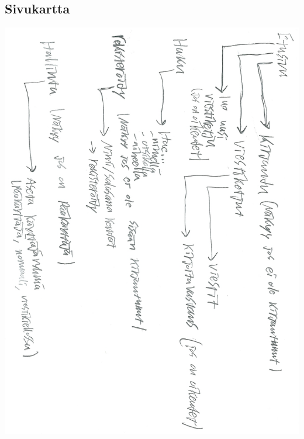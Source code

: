 \documentclass[a4paper, 12pt, finnish]{article}
\begin{document}
\subsection{Sivukartta}
\includegraphics[width=\textwidth,height=\textheight,keepaspectratio]{kayttoliittymakaavio.png}
\end{document}
